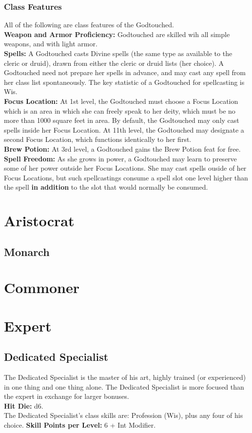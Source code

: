 \documentclass[11pt]{report}
\begin{document}
\subsubsection{Class Features}
All of the following are class features of the Godtouched. \\
\textbf{Weapon and Armor Proficiency:} Godtouched are skilled wih all simple
weapons, and with light armor. \\
\textbf{Spells:} A Godtouched casts Divine spells (the same type as available to
the cleric or druid), drawn from either the cleric or druid lists (her choice).
A Godtouched need not prepare her spells in advance, and may cast any spell from
her class list spontaneously. The key statistic of a Godtouched for spellcasting
is Wis. \\
\textbf{Focus Location:} At 1st level, the Godtouched must choose a Focus
Location which is an area in which she can freely speak to her deity, which must
be no more than 1000 square feet in area. By default, the Godtouched may only
cast spells inside her Focus Location. At 11th level, the Godtouched may
designate a second Focus Location, which functions identically to her first. \\
\textbf{Brew Potion:} At 3rd level, a Godtouched gains the Brew Potion feat for
free. \\
\textbf{Spell Freedom:} As she grows in power, a Godtouched may learn to
preserve some of her power outside her Focus Locations. She may cast spells
ouside of her Focus Locations, but such spellcastings consume a spell slot one
level higher than the spell \textbf{in addition} to the slot that would normally
be consumed. 

\section{Aristocrat}
\subsection{Monarch}

\section{Commoner}

\section{Expert}
\subsection{Dedicated Specialist}
The Dedicated Specialist is the master of his art, highly trained (or
experienced) in one thing and one thing alone. The Dedicated Specialist is more
focused than the expert in exchange for larger bonuses. \\
\textbf{Hit Die:} d6. \\
The Dedicated Specialist's class skills are: Profession (Wis), plus any four of
his choice.
\textbf{Skill Points per Level:} 6 + Int Modifier.
\end{document}
